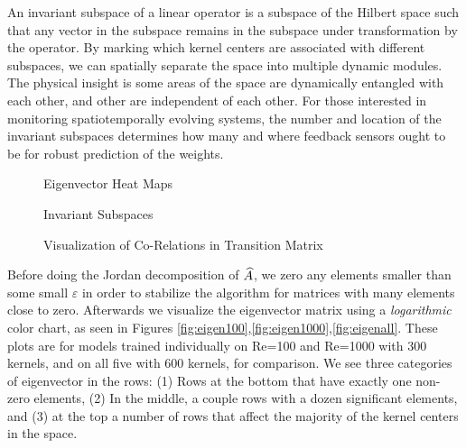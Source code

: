 An invariant subspace of a linear operator is a subspace of the Hilbert space such that any vector in the subspace remains in the subspace under transformation by the operator. By marking which kernel centers are associated with different subspaces, we can spatially separate the space into multiple dynamic modules. The physical insight is some areas of the space are dynamically entangled with each other, and other are independent of each other. For those interested in monitoring spatiotemporally evolving systems, the number and location of the invariant subspaces determines how many and where feedback sensors ought to be for robust prediction of the weights.
\begin{figure}[h] %
	\centering
	\caption{Eigenvector Heat Maps}
\end{figure}
\begin{figure}[h] %
	\centering
	\caption{Invariant Subspaces}
	\label{fig:subspaces}
\end{figure}
\begin{figure}[h] %
	\centering
	\caption{Visualization of Co-Relations in Transition Matrix}
\end{figure}
Before doing the Jordan decomposition of $\widehat{A}$, we zero any elements smaller than some small $\varepsilon$ in order to stabilize the algorithm for matrices with many elements close to zero. Afterwards we visualize the eigenvector matrix using a \emph{logarithmic} color chart, as seen in Figures \ref{fig:eigen100},\ref{fig:eigen1000},\ref{fig:eigenall}. These plots are for models trained individually on Re=100 and Re=1000 with 300 kernels, and on all five with 600 kernels, for comparison. We see three categories of eigenvector in the rows: (1) Rows at the bottom that have exactly one non-zero elements, (2) In the middle, a couple rows with a dozen significant elements, and (3) at the top a number of rows that affect the majority of the kernel centers in the space.

